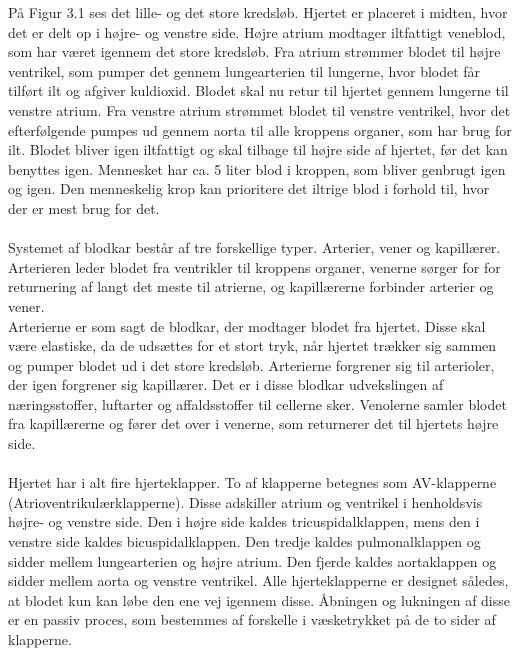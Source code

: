 På Figur 3.1 ses det lille- og det store kredsløb. Hjertet er placeret i midten, hvor det er delt op i højre- og venstre side. Højre atrium modtager iltfattigt veneblod, som har været igennem det store kredsløb. Fra atrium strømmer blodet til højre ventrikel, som pumper det gennem lungearterien til lungerne, hvor blodet får tilført ilt og afgiver kuldioxid. Blodet skal nu retur til hjertet gennem lungerne til venstre atrium. Fra venstre atrium strømmet blodet til venstre ventrikel, hvor det efterfølgende pumpes ud gennem aorta til alle kroppens organer, som har brug for ilt. Blodet bliver igen iltfattigt og skal tilbage til højre side af hjertet, før det kan benyttes igen. Mennesket har ca. 5 liter blod i kroppen, som bliver genbrugt igen og igen. Den menneskelig krop kan prioritere det iltrige blod i forhold til, hvor der er mest brug for det. 
\\ \\
Systemet af blodkar består af tre forskellige typer. Arterier, vener og kapillærer. Arterieren leder blodet fra ventrikler til kroppens organer, venerne sørger for for returnering af langt det meste til atrierne, og kapillærerne forbinder arterier og vener. 
 \\
Arterierne er som sagt de blodkar, der modtager blodet fra hjertet. Disse skal være elastiske, da de udsættes for et stort tryk, når hjertet trækker sig sammen og pumper blodet ud i det store kredsløb. Arterierne forgrener sig til arterioler, der igen forgrener sig kapillærer. Det er i disse blodkar udvekslingen af næringsstoffer, luftarter og affaldsstoffer til cellerne sker. Venolerne samler blodet fra kapillærerne og fører det over i venerne, som returnerer det til hjertets højre side.
\\ \\
Hjertet har i alt fire hjerteklapper. To af klapperne betegnes som AV-klapperne (Atrioventrikulærklapperne). Disse adskiller atrium og ventrikel i henholdsvis højre- og venstre side. Den i højre side kaldes tricuspidalklappen, mens den i venstre side kaldes bicuspidalklappen. Den tredje kaldes pulmonalklappen og sidder mellem lungearterien og højre atrium. Den fjerde kaldes aortaklappen og sidder mellem aorta og venstre ventrikel. Alle hjerteklapperne er designet således, at blodet kun kan løbe den ene vej igennem disse. Åbningen og lukningen af disse er en passiv proces, som bestemmes af forskelle i væsketrykket på de to sider af klapperne. 

